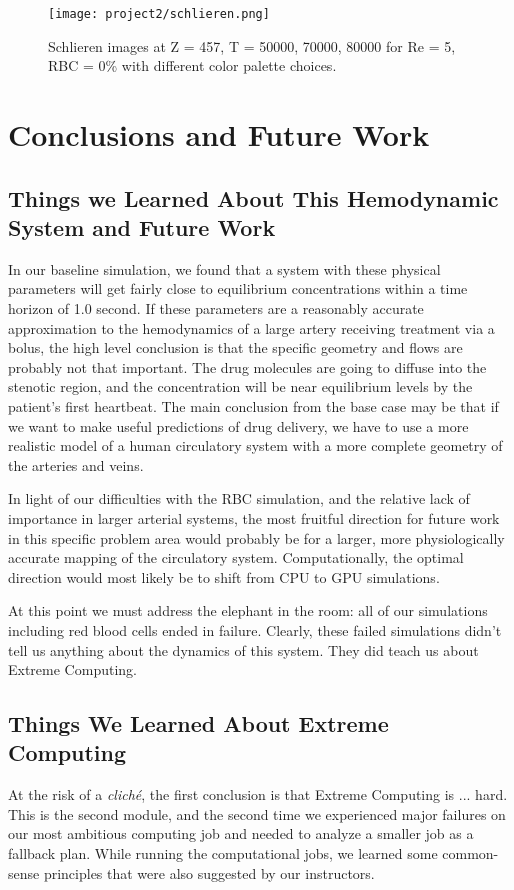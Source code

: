\documentclass[11pt]{article} %
\begin{document}
\begin{figure}[H]
    \centering
    \texttt{[image: project2/schlieren.png]}
    \caption{Schlieren images at Z = 457, T = 50000, 70000, 80000 for Re = 5, RBC = 0\% with different color palette choices.}
    \label{fig:my_label}
\end{figure}

\newpage
\section{Conclusions and Future Work}

\subsection{Things we Learned About This Hemodynamic System and Future Work}
			In our baseline simulation, we found that a system with these physical
			parameters will get fairly close to equilibrium concentrations within a time horizon of 1.0 second.  
			If these parameters are a reasonably accurate approximation to the hemodynamics of a large
			artery receiving treatment via a bolus, the high level conclusion is that the specific geometry
			and flows are probably not that important.  
			The drug molecules are going to diffuse into the stenotic region, and the concentration will
			be near equilibrium levels by the patient's first heartbeat.
			The main conclusion from the base case may be that if we want to make useful predictions
			of drug delivery, we have to use a more realistic model of a human circulatory system
			with a more complete geometry of the arteries and veins.
			
			In light of our difficulties with the RBC simulation, and the relative lack of importance
			in larger arterial systems, the most fruitful direction for future work in this specific problem
			area would probably be for a larger, more physiologically accurate mapping of the circulatory system.  
			Computationally, the optimal direction would most likely be to shift from CPU to GPU simulations.
			
	At this point we must address the elephant in the room: 
			all of our simulations including red blood cells ended in failure.
			Clearly, these failed simulations didn't tell us anything about the dynamics of this system.
			They did teach us about Extreme Computing.
			
			\subsection{Things We Learned About Extreme Computing}
			At the risk of a \textit{clich\'e}, the first conclusion is that Extreme Computing is ... hard.
			This is the second module, and the second time we experienced major failures on 
			our most ambitious computing job and needed to analyze a smaller job as a fallback plan.
			While running the computational jobs, we learned some common-sense principles that
			were also suggested by our instructors.  
			
\end{document}

